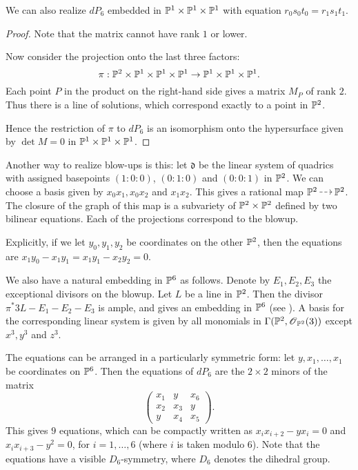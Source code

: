 \documentclass[]{uiophd}
\begin{document}
\begin{lemma}
We can also realize $dP_6$ embedded in $\mathbb{P}^1 \times \mathbb{P}^1 \times \mathbb{P}^1$ with equation $r_0s_0t_0=r_1s_1t_1$.
\end{lemma}
\begin{proof}
Note that the matrix cannot have rank $1$ or lower.

Now consider the projection onto the last three factors:
$$
\pi:\mathbb{P}^2 \times \mathbb{P}^1 \times \mathbb{P}^1 \times \mathbb{P}^1 \to \mathbb{P}^1 \times \mathbb{P}^1 \times \mathbb{P}^1.
$$
Each point $P$ in the product on the right-hand side gives a matrix $M_P$ of rank $2$. Thus there is a line of solutions, which correspond exactly to a point in $\mathbb{P}^2$.

Hence the restriction of $\pi$ to $dP_6$ is an isomorphism onto the hypersurface given by $\det M=0$ in $\mathbb{P}^1 \times \mathbb{P}^1 \times \mathbb{P}^1$. 
\end{proof}

Another way to realize blow-ups is this: let $\mathfrak d$ be the linear system of quadrics with assigned basepoints $(1:0:0)$, $(0:1:0)$ and $(0:0:1)$ in $\mathbb{P}^2$. We can choose a basis given by $x_0x_1,x_0x_2$ and $x_1x_2$. This gives a rational map $\PP^2 \rmap \PP^2$. The closure of the graph of this map is a subvariety of $\mathbb{P}^2 \times \mathbb{P}^2$ defined by two bilinear equations. Each of the projections correspond to the blowup.

Explicitly, if we let $y_0,y_1,y_2$ be coordinates on the other $\mathbb{P}^2$, then the equations are $x_1y_0-x_1y_1=x_1y_1-x_2y_2=0$.

We also have a natural embedding in $\mathbb{P}^6$ as follows. Denote by $E_1, E_2, E_3$ the exceptional divisors on the blowup. Let $L$ be a line in $\mathbb{P}^2$. Then the divisor $\pi^\ast 3L - E_1-E_2-E_3$ is ample, and gives an embedding in $\mathbb{P}^6$ (see \cite[Chapter V, Theorem 4.6]{hartshorne}). A basis for the corresponding linear system is given by all monomials in $\Gamma(\mathbb{P}^2,\operatorname{\mathscr{O}}_{\mathbb{P}^2}(3))$ except $x^3,y^3$ and $z^3$. 

The equations can be arranged in a particularly symmetric form: let $y,x_1,\ldots,x_1$ be coordinates on $\mathbb{P}^6$. Then the equations of $dP_6$ are the $2 \times 2$ minors of the matrix
$$
\begin{pmatrix}
x_1 & y & x_6 \\
x_2 & x_3 & y \\
y & x_4 & x_5
\end{pmatrix}.
$$
This gives $9$ equations, which can be compactly written as $x_ix_{i+2}-yx_i=0$ and $x_ix_{i+3}-y^2=0$, for $i=1,\ldots,6$ (where $i$ is taken modulo $6$). Note that the equations have a visible $D_6$-symmetry, where $D_6$ denotes the dihedral group.
\end{document}
